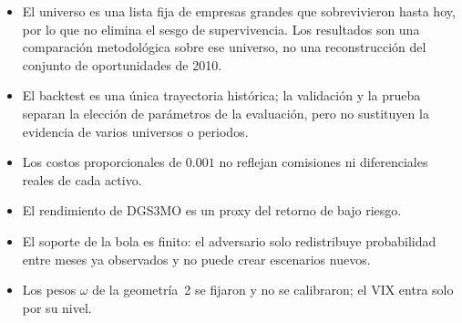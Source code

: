 \begin{itemize}
    \item El universo es una lista fija de empresas grandes que sobrevivieron hasta hoy, por lo que no elimina el sesgo de supervivencia. Los resultados son una comparación metodológica sobre ese universo, no una reconstrucción del conjunto de oportunidades de 2010.
    \item El backtest es una única trayectoria histórica; la validación y la prueba separan la elección de parámetros de la evaluación, pero no sustituyen la evidencia de varios universos o periodos.
    \item Los costos proporcionales de $0.001$ no reflejan comisiones ni diferenciales reales de cada activo.
    \item El rendimiento de DGS3MO es un proxy del retorno de bajo riesgo.
    \item El soporte de la bola es finito: el adversario solo redistribuye probabilidad entre meses ya observados y no puede crear escenarios nuevos.
    \item Los pesos $\omega$ de la geometría~2 se fijaron y no se calibraron; el VIX entra solo por su nivel.
    

\end{itemize}
